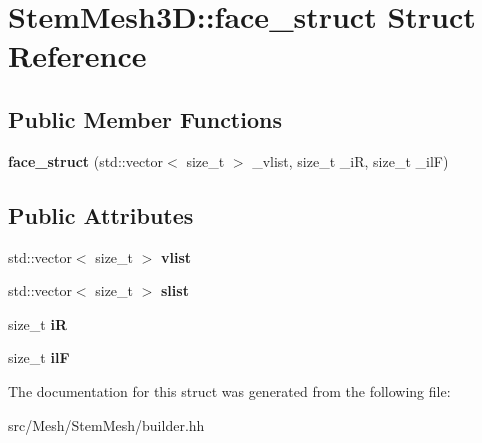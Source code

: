 \hypertarget{structStemMesh3D_1_1face__struct}{}\section{Stem\+Mesh3D\+:\+:face\+\_\+struct Struct Reference}
\label{structStemMesh3D_1_1face__struct}
\subsection*{Public Member Functions}
\begin{DoxyCompactItemize}
\item 
\mbox{\label{structStemMesh3D_1_1face__struct_a85cabe7417964e48c316f0d9e3f9735f}} 
{\bfseries face\+\_\+struct} (std\+::vector$<$ size\+\_\+t $>$ \+\_\+vlist, size\+\_\+t \+\_\+iR, size\+\_\+t \+\_\+ilF)
\end{DoxyCompactItemize}
\subsection*{Public Attributes}
\begin{DoxyCompactItemize}
\item 
\mbox{\label{structStemMesh3D_1_1face__struct_af5f53e7040bcf1cde9df255c11a6b585}} 
std\+::vector$<$ size\+\_\+t $>$ {\bfseries vlist}
\item 
\mbox{\label{structStemMesh3D_1_1face__struct_a0650946eadda2c3bbd05b2e6b73c00a7}} 
std\+::vector$<$ size\+\_\+t $>$ {\bfseries slist}
\item 
\mbox{\label{structStemMesh3D_1_1face__struct_ad2056a18a217aa0c65403005aa189f64}} 
size\+\_\+t {\bfseries iR}
\item 
\mbox{\label{structStemMesh3D_1_1face__struct_aa345d459888d42f8015f9198f200b2f1}} 
size\+\_\+t {\bfseries ilF}
\end{DoxyCompactItemize}


The documentation for this struct was generated from the following file\+:\begin{DoxyCompactItemize}
\item 
src/\+Mesh/\+Stem\+Mesh/builder.\+hh\end{DoxyCompactItemize}
